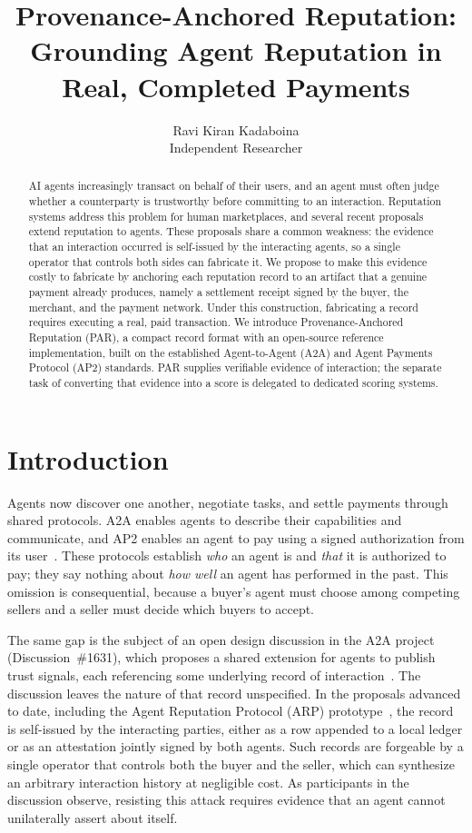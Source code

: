 \documentclass[11pt]{article}
\title{\textbf{Provenance-Anchored Reputation:\\ Grounding Agent Reputation in Real, Completed Payments}}
\author{Ravi Kiran Kadaboina\\ \small Independent Researcher}
\date{}
\begin{document}
\maketitle

\begin{abstract}
AI agents increasingly transact on behalf of their users, and an agent must often
judge whether a counterparty is trustworthy before committing to an interaction.
Reputation systems address this problem for human marketplaces, and several recent
proposals extend reputation to agents. These proposals share a common weakness: the
evidence that an interaction occurred is self-issued by the interacting agents, so a
single operator that controls both sides can fabricate it. We propose to make this
evidence costly to fabricate by anchoring each reputation record to an artifact that a
genuine payment already produces, namely a settlement receipt signed by the buyer, the
merchant, and the payment network. Under this construction, fabricating a record
requires executing a real, paid transaction. We introduce Provenance-Anchored
Reputation (PAR), a compact record format with an open-source reference implementation,
built on the established Agent-to-Agent (A2A) and Agent Payments Protocol (AP2)
standards. PAR supplies verifiable evidence of interaction; the separate task of
converting that evidence into a score is delegated to dedicated scoring systems.
\end{abstract}

\section{Introduction}
Agents now discover one another, negotiate tasks, and settle payments through shared
protocols. A2A enables agents to describe their capabilities and communicate, and AP2
enables an agent to pay using a signed authorization from its user~\cite{ap2,a2a}.
These protocols establish \emph{who} an agent is and \emph{that} it is authorized to
pay; they say nothing about \emph{how well} an agent has performed in the past. This
omission is consequential, because a buyer's agent must choose among competing sellers
and a seller must decide which buyers to accept.

The same gap is the subject of an open design discussion in the A2A project
(Discussion~\#1631), which proposes a shared extension for agents to publish trust
signals, each referencing some underlying record of interaction~\cite{arp1631}. The
discussion leaves the nature of that record unspecified. In the proposals advanced to
date, including the Agent Reputation Protocol (ARP) prototype~\cite{arp}, the record is
self-issued by the interacting parties, either as a row appended to a local ledger or
as an attestation jointly signed by both agents. Such records are forgeable by a single
operator that controls both the buyer and the seller, which can synthesize an arbitrary
interaction history at negligible cost. As participants in the discussion observe,
resisting this attack requires evidence that an agent cannot unilaterally assert about
itself.
\end{document}
